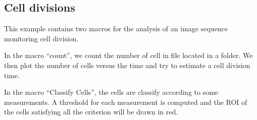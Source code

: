 { 
\subsection{Cell divisions}
This example contains two macros for the analysis of an image sequence
monitoring cell division.

In the macro ``count'', we count the number of cell in file located in
a folder. We then plot the number of cells versus the time and try to
estimate a cell division time.

In the macro ``Classify Cells'', the cells are classify according to
some measurements. A threshold for each measurement is computed and
the ROI of the cells satisfying all the criterion will be drawn in
red.



} %


